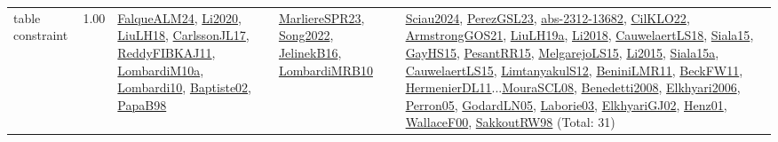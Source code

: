 {\begin{longtable}{p{3cm}r>{\raggedright\arraybackslash}p{6cm}>{\raggedright\arraybackslash}p{6cm}>{\raggedright\arraybackslash}p{8cm}}
\index{table constraint}\index{Constraints!table constraint}table constraint &  1.00 & \hyperref[detail:FalqueALM24]{FalqueALM24}, \hyperref[detail:Li2020]{Li2020}, \hyperref[detail:LiuLH18]{LiuLH18}, \hyperref[detail:CarlssonJL17]{CarlssonJL17}, \hyperref[detail:ReddyFIBKAJ11]{ReddyFIBKAJ11}, \hyperref[detail:LombardiM10a]{LombardiM10a}, \hyperref[detail:Lombardi10]{Lombardi10}, \hyperref[detail:Baptiste02]{Baptiste02}, \hyperref[detail:PapaB98]{PapaB98} & \hyperref[detail:MarliereSPR23]{MarliereSPR23}, \hyperref[detail:Song2022]{Song2022}, \hyperref[detail:JelinekB16]{JelinekB16}, \hyperref[detail:LombardiMRB10]{LombardiMRB10} & \hyperref[detail:Sciau2024]{Sciau2024}, \hyperref[detail:PerezGSL23]{PerezGSL23}, \hyperref[detail:abs-2312-13682]{abs-2312-13682}, \hyperref[detail:CilKLO22]{CilKLO22}, \hyperref[detail:ArmstrongGOS21]{ArmstrongGOS21}, \hyperref[detail:LiuLH19a]{LiuLH19a}, \hyperref[detail:Li2018]{Li2018}, \hyperref[detail:CauwelaertLS18]{CauwelaertLS18}, \hyperref[detail:Siala15]{Siala15}, \hyperref[detail:GayHS15]{GayHS15}, \hyperref[detail:PesantRR15]{PesantRR15}, \hyperref[detail:MelgarejoLS15]{MelgarejoLS15}, \hyperref[detail:Li2015]{Li2015}, \hyperref[detail:Siala15a]{Siala15a}, \hyperref[detail:CauwelaertLS15]{CauwelaertLS15}, \hyperref[detail:LimtanyakulS12]{LimtanyakulS12}, \hyperref[detail:BeniniLMR11]{BeniniLMR11}, \hyperref[detail:BeckFW11]{BeckFW11}, \hyperref[detail:HermenierDL11]{HermenierDL11}...\hyperref[detail:MouraSCL08]{MouraSCL08}, \hyperref[detail:Benedetti2008]{Benedetti2008}, \hyperref[detail:Elkhyari2006]{Elkhyari2006}, \hyperref[detail:Perron05]{Perron05}, \hyperref[detail:GodardLN05]{GodardLN05}, \hyperref[detail:Laborie03]{Laborie03}, \hyperref[detail:ElkhyariGJ02]{ElkhyariGJ02}, \hyperref[detail:Henz01]{Henz01}, \hyperref[detail:WallaceF00]{WallaceF00}, \hyperref[detail:SakkoutRW98]{SakkoutRW98} (Total: 31)\\
\end{longtable}
}

\clearpage
